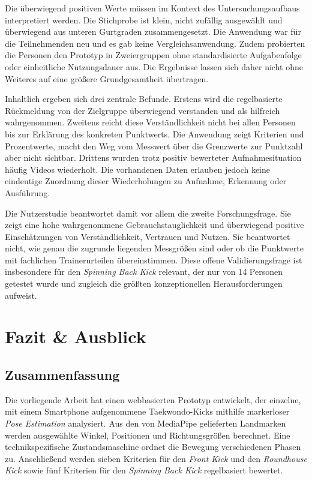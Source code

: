 \documentclass[intern]{cgMA}
\begin{document}
Die überwiegend positiven Werte müssen im Kontext des Untersuchungsaufbaus interpretiert werden. Die Stichprobe ist klein, nicht zufällig ausgewählt und überwiegend aus unteren Gurtgraden zusammengesetzt. Die Anwendung war für die Teilnehmenden neu und es gab keine Vergleichsanwendung. Zudem probierten die Personen den Prototyp in Zweiergruppen ohne standardisierte Aufgabenfolge oder einheitliche Nutzungsdauer aus. Die Ergebnisse lassen sich daher nicht ohne Weiteres auf eine größere Grundgesamtheit übertragen.

Inhaltlich ergeben sich drei zentrale Befunde. Erstens wird die regelbasierte Rückmeldung von der Zielgruppe überwiegend verstanden und als hilfreich wahrgenommen. Zweitens reicht diese Verständlichkeit nicht bei allen Personen bis zur Erklärung des konkreten Punktwerts. Die Anwendung zeigt Kriterien und Prozentwerte, macht den Weg vom Messwert über die Grenzwerte zur Punktzahl aber nicht sichtbar. Drittens wurden trotz positiv bewerteter Aufnahmesituation häufig Videos wiederholt. Die vorhandenen Daten erlauben jedoch keine eindeutige Zuordnung dieser Wiederholungen zu Aufnahme, Erkennung oder Ausführung.

Die Nutzerstudie beantwortet damit vor allem die zweite Forschungsfrage. Sie zeigt eine hohe wahrgenommene Gebrauchstauglichkeit und überwiegend positive Einschätzungen von Verständlichkeit, Vertrauen und Nutzen. Sie beantwortet nicht, wie genau die zugrunde liegenden Messgrößen sind oder ob die Punktwerte mit fachlichen Trainerurteilen übereinstimmen. Diese offene Validierungsfrage ist insbesondere für den \textit{Spinning Back Kick} relevant, der nur von 14 Personen getestet wurde und zugleich die größten konzeptionellen Herausforderungen aufweist.

\section{Fazit \& Ausblick}

\subsection{Zusammenfassung}
Die vorliegende Arbeit hat einen webbasierten Prototyp entwickelt, der einzelne, mit einem Smartphone aufgenommene Taekwondo-Kicks mithilfe markerloser \textit{Pose Estimation} analysiert. Aus den von MediaPipe gelieferten Landmarken werden ausgewählte Winkel, Positionen und Richtungsgrößen berechnet. Eine technikspezifische Zustandsmaschine ordnet die Bewegung verschiedenen Phasen zu. Anschließend werden sieben Kriterien für den \textit{Front Kick} und den \textit{Roundhouse Kick} sowie fünf Kriterien für den \textit{Spinning Back Kick} regelbasiert bewertet.
\end{document}
